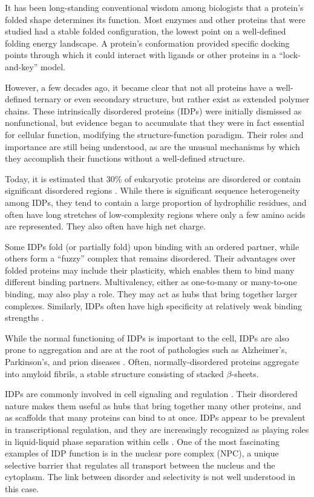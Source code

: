 It has been long-standing conventional wisdom among biologists that a protein's folded shape determines its function.  Most enzymes and other proteins that were studied had a stable folded configuration, the lowest point on a well-defined folding energy landscape.  A protein's conformation provided specific docking points through which it could interact with ligands or other proteins in a ``lock-and-key'' model.

However, a few decades ago, it became clear that not all proteins have a well-defined ternary or even secondary structure, but rather exist as extended polymer chains.  These intrinsically disordered proteins (IDPs) were initially dismissed as nonfunctional, but evidence began to accumulate that they were in fact essential for cellular function, modifying the structure-function paradigm.  Their roles and importance are still being understood, as are the unusual mechanisms by which they accomplish their functions without a well-defined structure.

Today, it is estimated that 30\% of eukaryotic proteins are disordered or contain significant disordered regions \cite{uversky13}.  While there is significant sequence heterogeneity among IDPs, they tend to contain a large proportion of hydrophilic residues, and often have long stretches of low-complexity regions where only a few amino acids are represented.  They also often have high net charge.

Some IDPs fold (or partially fold) upon binding with an ordered partner, while others form a ``fuzzy'' complex that remains disordered.  Their advantages over folded proteins may include their plasticity, which enables them to bind many different binding partners.  Multivalency, either as one-to-many or many-to-one binding, may also play a role.  They may act as hubs that bring together larger complexes.  Similarly, IDPs often have high specificity at relatively weak binding strengths \cite{wright15, aramburu17}.

While the normal functioning of IDPs is important to the cell, IDPs are also prone to aggregation and are at the root of pathologies such as Alzheimer's, Parkinson's, and prion diseases \cite{babu11}.  Often, normally-disordered proteins aggregate into amyloid fibrils, a stable structure consisting of stacked $\beta$-sheets.

IDPs are commonly involved in cell signaling and regulation \cite{wright15}.  Their disordered nature makes them useful as hubs that bring together many other proteins, and as scaffolds that many proteins can bind to at once.  IDPs appear to be prevalent in transcriptional regulation, and they are increasingly recognized as playing roles in liquid-liquid phase separation within cells \cite{brangwynne15}.  One of the most fascinating examples of IDP function is in the nuclear pore complex (NPC), a unique selective barrier that regulates all transport between the nucleus and the cytoplasm.  The link between disorder and selectivity is not well understood in this case.

